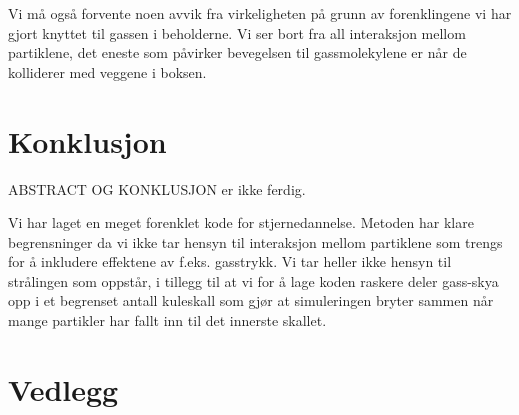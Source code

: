 \documentclass[reprint,english,notitlepage]{revtex4-1}  %
\begin{document}
Vi må også forvente noen avvik fra virkeligheten på grunn av forenklingene vi har gjort
 knyttet til gassen i beholderne. Vi ser bort fra all interaksjon mellom partiklene, det eneste som påvirker bevegelsen til gassmolekylene er når de kolliderer med veggene i boksen. 


\section{Konklusjon}

ABSTRACT OG KONKLUSJON er ikke ferdig.

Vi har laget en meget forenklet kode for stjernedannelse. Metoden har klare begrensninger da vi ikke tar hensyn til interaksjon mellom partiklene som trengs for å inkludere effektene av f.eks. gasstrykk. Vi tar heller ikke hensyn til strålingen som oppstår, i tillegg til at vi for å lage koden raskere deler gass-skya opp i et begrenset antall kuleskall som gjør at simuleringen bryter sammen når mange partikler har fallt inn til det innerste skallet.


\section{Vedlegg}
\end{document}
